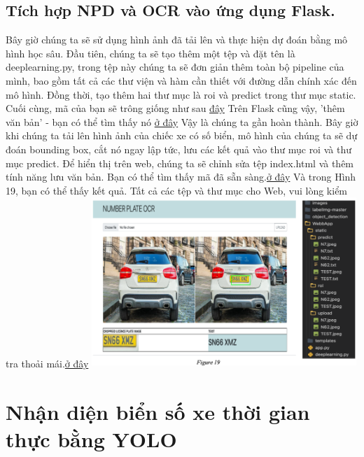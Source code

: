 \documentclass{article}
\begin{document}
\subsection{Tích hợp NPD và OCR vào ứng dụng Flask.}
Bây giờ chúng ta sẽ sử dụng hình ảnh đã tải lên và thực hiện dự đoán bằng mô hình học sâu. Đầu tiên, chúng ta sẽ tạo thêm một tệp và đặt tên là deeplearning.py, trong tệp này chúng ta sẽ đơn giản thêm toàn bộ pipeline của mình, bao gồm tất cả các thư viện và hàm cần thiết với đường dẫn chính xác đến mô hình. Đồng thời, tạo thêm hai thư mục là roi và predict trong thư mục static. Cuối cùng, mã của bạn sẽ trông giống như sau 
\href{https://github.com/Asikpalysik/Automatic-License-Plate Detection/blob/main/WebbApp/deeplearning.py}{đây}
Trên Flask cũng vậy, 'thêm văn bản' - bạn có thể tìm thấy nó \href{https://github.com/Asikpalysik/Automatic-License-Plate Detection/blob/main/WebbApp/app.py}{ở đây}
Vậy là chúng ta gần hoàn thành. Bây giờ khi chúng ta tải lên hình ảnh của chiếc xe có số biển, mô hình của chúng ta sẽ dự đoán bounding box, cắt nó ngay lập tức, lưu các kết quả vào thư mục roi và thư mục predict. Để hiển thị trên web, chúng ta sẽ chỉnh sửa tệp index.html và thêm tính năng lưu văn bản. Bạn có thể tìm thấy mã đã sẵn sàng.\href{https://github.com/Asikpalysik/Automatic-License-Plate-Detection/blob/main/WebbApp/templates/index.html}{ở đây}
Và trong Hình 19, bạn có thể thấy kết quả. Tất cả các tệp và thư mục cho Web, vui lòng kiểm tra thoải mái.\href{https://github.com/Asikpalysik/Automatic-License-Plate-Detection/tree/main/WebbApp}{ở đây}
\includegraphics[width= 10cm]{img/img/Screenshot 2024-11-20 201114.png}


\section{Nhận diện biển số xe thời gian thực bằng YOLO}
\end{document}
